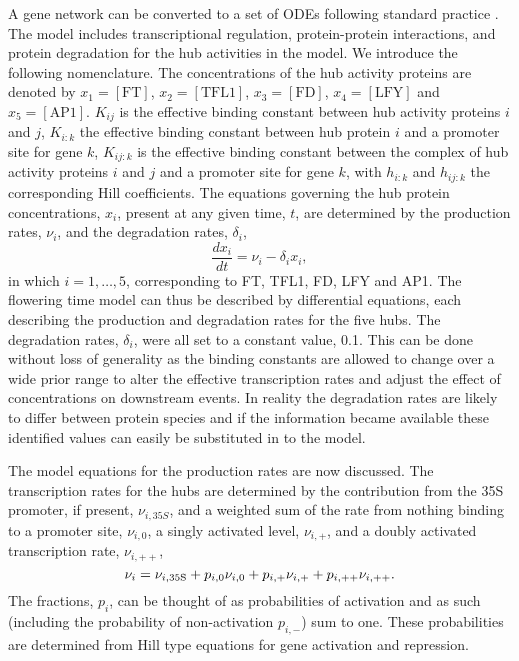 A gene network can be converted to a set of ODEs following standard practice \cite{alon2006}. 
The model includes transcriptional regulation, protein-protein interactions, and protein degradation for the hub activities in the model.
We introduce the following nomenclature.
The concentrations of the hub activity proteins are denoted by $x_1=[\mathrm{FT}]$, $x_2=[\mathrm{TFL1}]$, $x_3=[\mathrm{FD}]$, $x_4=[\mathrm{LFY}]$ and $x_5=[\mathrm{AP1}]$.
$K_{ij}$ is the effective binding constant between hub activity proteins $i$ and $j$, 
$K_{i:k}$ the effective binding constant between hub protein $i$ and a promoter site for gene $k$, 
$K_{ij:k}$ is the effective binding constant between the complex of hub activity proteins $i$ and $j$ and a promoter site for gene $k$, with $h_{i:k}$ and $h_{ij:k}$ the corresponding Hill coefficients. 
The equations governing the hub protein concentrations, $x_i$, present at any given time, $t$, are determined by the production rates, $\nu_i$, and the degradation rates, $\delta_i$, 
\begin{equation*}
\frac{dx_i}{dt}=\nu_i - \delta_{i} x_i,
\end{equation*}
in which $i=1,\ldots,5$, corresponding to FT, TFL1, FD, LFY and AP1.
The flowering time model can thus be described by differential equations, each describing the production and degradation rates for the five hubs. 
The degradation rates, $\delta_i$, were all set to a constant value, 0.1.
This can be done without loss of generality as the binding constants are allowed to change over a wide prior range to alter the effective transcription rates and adjust the effect of concentrations on downstream events. 
In reality the degradation rates are likely to differ between protein species and if the information became available these identified values can easily be substituted in to the model.

The model equations for the production rates are now discussed.
The transcription rates for the hubs are determined by the contribution from the 35S promoter, if present, $\nu_{i,\mathrm 35S}$, and a weighted sum of the rate from nothing binding to a promoter site, $\nu_{i,0}$, a singly activated level, $\nu_{i,+}$, and a doubly activated transcription rate, $\nu_{i,++}$, 
\begin{equation*}
\nu_i=\nu_{i,\rm 35S} + p_{i,0} \nu_{i,0} + p_{i,+} \nu_{i,+} + p_{i,++} \nu_{i,++}. 
\end{equation*}
The fractions, $p_i$, can be thought of as probabilities of activation and as such (including the probability of non-activation $p_{i,-}$) sum to one. 
These probabilities are determined from Hill type equations for gene activation and repression.

